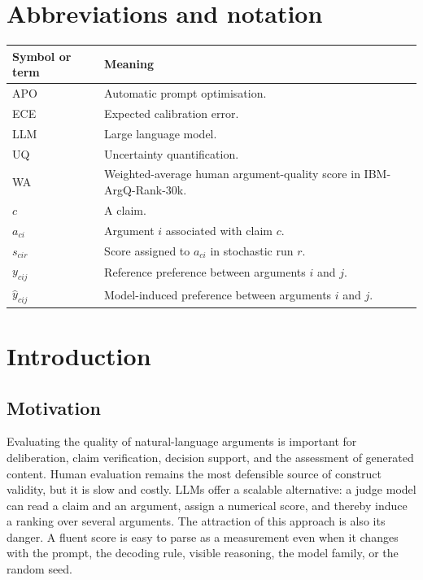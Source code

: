 \documentclass[11pt,twoside,a4paper]{report}
\begin{document}
\chapter*{Abbreviations and notation}
\begin{longtable}{@{}p{}p{}@{}}
\toprule
Symbol or term & Meaning \\
\midrule
APO & Automatic prompt optimisation. \\
ECE & Expected calibration error. \\
LLM & Large language model. \\
UQ & Uncertainty quantification. \\
WA & Weighted-average human argument-quality score in IBM-ArgQ-Rank-30k. \\
$c$ & A claim. \\
$a_{ci}$ & Argument $i$ associated with claim $c$. \\
$s_{cir}$ & Score assigned to $a_{ci}$ in stochastic run $r$. \\
$y_{cij}$ & Reference preference between arguments $i$ and $j$. \\
$\widehat y_{cij}$ & Model-induced preference between arguments $i$ and $j$. \\
\bottomrule
\end{longtable}

\clearpage
{}
\setcounter{page}{1}

\chapter{Introduction}
\label{chap:introduction}

\section{Motivation}

Evaluating the quality of natural-language arguments is important for deliberation,
claim verification, decision support, and the assessment of generated content.
Human evaluation remains the most defensible source of construct validity, but it is
slow and costly.  LLMs offer a scalable alternative: a judge model can read a claim
and an argument, assign a numerical score, and thereby induce a ranking over several
arguments.  The attraction of this approach is also its danger.  A fluent score is
easy to parse as a measurement even when it changes with the prompt, the decoding
rule, visible reasoning, the model family, or the random seed.
\end{document}
